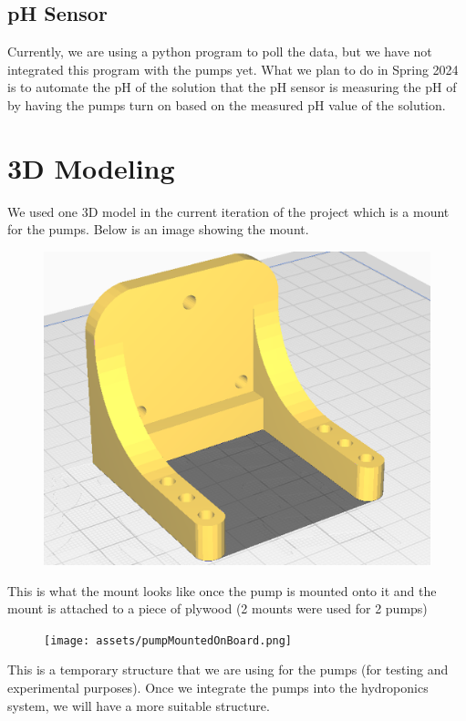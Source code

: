 \documentclass{article}
\begin{document}
        \subsection{pH Sensor}
            \begin{flushleft}
                Currently, we are using a python program to poll the data, but we have not integrated this program with the pumps yet. What we plan to do in Spring 2024 is to automate the pH of the solution that the pH sensor is measuring the pH of by having the pumps turn on based on the measured pH value of the solution.
            \end{flushleft}
    \section{3D Modeling}
        \begin{flushleft}
            We used one 3D model in the current iteration of the project which is a mount for the pumps. Below is an image showing the mount.
            \begin{figure}[!hbt]
                \centering
                \includegraphics[width=0.50\linewidth]{assets/pPumpIsoView.png} %
            \end{figure}
        \end{flushleft}
        \begin{flushleft}
            This is what the mount looks like once the pump is mounted onto it and the mount is attached to a piece of plywood (2 mounts were used for 2 pumps)
            \begin{figure}[!hbt]
                \centering
                \texttt{[image: assets/pumpMountedOnBoard.png]} %
            \end{figure}
        \end{flushleft}
        \begin{flushleft}
            This is a temporary structure that we are using for the pumps (for testing and experimental purposes). Once we integrate the pumps into the hydroponics system, we will have a more suitable structure.
        \end{flushleft}
\end{document}
